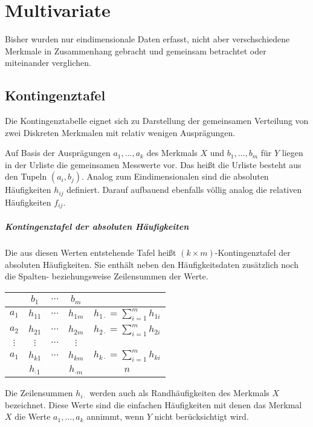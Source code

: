 \chapter{Multivariate}
Bisher wurden nur eindimensionale Daten erfasst, nicht aber verschschiedene Merkmale in Zusammenhang gebracht und gemeinsam betrachtet oder miteinander verglichen.
\section{Kontingenztafel}
Die Kontingenztabelle eignet sich zu Darstellung der gemeinsamen Verteilung von zwei Diskreten Merkmalen mit relativ wenigen Ausprägungen.

Auf Basis der Ausprägungen $a_1,\ldots,a_k$ des Merkmals $X$ und $b_1,\ldots,b_m$ für $Y$ liegen in der Urliste die gemeinsamen Messwerte vor. Das heißt die Urliste besteht aus den Tupeln $(a_i,b_j)$. Analog zum Eindimensionalen sind die absoluten Häufigkeiten $h_{ij}$ definiert. Darauf aufbauend ebenfalls völlig analog die relativen Häufigkeiten $f_{ij}$.

\paragraph{Kontingenztafel der absoluten Häufigkeiten}
Die aus diesen Werten entstehende Tafel heißt $(k\times m)$-Kontingenztafel der absoluten Häufigkeiten. Sie enthält neben den Häufigkeitsdaten zusätzlich noch die Spalten- beziehungsweise Zeilensummen der Werte.

\begin{center}
	\begin{tabular}{c|ccc|c}
		& $b_1$ & $\cdots$ & $b_m$ &\\
		\hline $a_1$ & $h_{11}$ & $\cdots$ & $h_{1m}$&$h_{1\cdot}=\sum_{i=1}^m h_{1i}$\\
		$a_2$ & $h_{21}$ & $\cdots$ & $h_{2m}$&$h_{2\cdot}=\sum_{i=1}^m h_{2i}$\\
		$\vdots$ & $\vdots$ & $\cdots$ & $\vdots$&\\
		$a_1$ & $h_{k1}$ & $\cdots$ & $h_{km}$&$h_{k\cdot}=\sum_{i=1}^m h_{ki}$\\
		\hline &$h_{\cdot1}$&&$h_{\cdot m}$&$n$
	\end{tabular}
\end{center}

Die Zeilensummen $h_{i\cdot}$ werden auch als Randhäufigkeiten des Merkmals $X$ bezeichnet. Diese Werte sind die einfachen Häufigkeiten mit denen das Merkmal $X$ die Werte $a_1,\ldots,a_k$ annimmt, wenn $Y$ nicht berücksichtigt wird.

